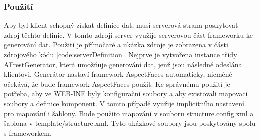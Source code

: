 \subsubsection{Použití}
Aby byl klient schopný získat definice dat, musí serverová strana poskytovat zdroj těchto definic. V tomto zdroji server využije serverovou část frameworku ke generování dat. Použití je přímočaré a ukázka zdroje je zobrazena v části zdrojového kódu \ref{code:serverDefinition}. Nejprve je vytvořena instance třídy AFrestGenerator, která umožňuje generování dat, jenž jsou následně odeslána klientovi. Generátor nastaví framework AspectFaces automaticky, nicméně očekává, že bude framework AspectFaces použit. Ke správnému použití je potřeba, aby ve WEB-INF byly konfigurační soubory a aby existovali mapovací soubory a definice komponent. V tomto případě využije implicitního nastavení pro mapování i šablony. Bude použito mapování v souboru structure.config.xml a šablona v template/structure.xml. Tyto ukázkové soubory jsou poskytovány spolu s frameworkem.

